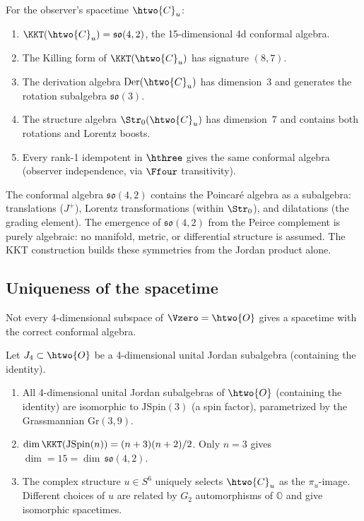 \begin{proposition}
\label{prop:kkt}
For the observer's spacetime $\htwo{C}_u$:
\begin{enumerate}[label=(\alph*)]
\item $\KKT(\htwo{C}_u) = \mathfrak{so}(4,2)$, the 15-dimensional
  4d conformal algebra.

\item The Killing form of $\KKT(\htwo{C}_u)$ has signature $(8, 7)$.

\item The derivation algebra $\mathrm{Der}(\htwo{C}_u)$ has dimension~3
  and generates the rotation subalgebra $\mathfrak{so}(3)$.

\item The structure algebra $\Str_0(\htwo{C}_u)$ has dimension~7 and
  contains both rotations and Lorentz boosts.

\item Every rank-1 idempotent in $\hthree$ gives the same conformal
  algebra (observer independence, via $\Ffour$ transitivity).
\end{enumerate}
\end{proposition}

The conformal algebra $\mathfrak{so}(4,2)$ contains the Poincar\'e
algebra as a subalgebra: translations ($J^+$), Lorentz transformations
(within $\Str_0$), and dilatations (the grading element). The emergence
of $\mathfrak{so}(4,2)$ from the Peirce complement is purely algebraic:
no manifold, metric, or differential structure is assumed. The KKT
construction builds these symmetries from the Jordan product alone.

\subsection{Uniqueness of the spacetime}

Not every 4-dimensional subspace of $\Vzero = \htwo{O}$ gives a
spacetime with the correct conformal algebra.

\begin{proposition}
\label{prop:uniqueness}
Let $J_4 \subset \htwo{O}$ be a 4-dimensional unital Jordan subalgebra
(containing the identity).
\begin{enumerate}[label=(\alph*)]
\item All 4-dimensional unital Jordan subalgebras of $\htwo{O}$
  (containing the identity) are isomorphic to $\mathrm{JSpin}(3)$
  (a spin factor), parametrized by the Grassmannian $\mathrm{Gr}(3, 9)$.

\item $\dim \KKT(\mathrm{JSpin}(n)) = (n+3)(n+2)/2$.
  Only $n = 3$ gives $\dim = 15 = \dim\,\mathfrak{so}(4,2)$.

\item The complex structure $u \in S^6$ uniquely selects $\htwo{C}_u$
  as the $\pi_u$-image. Different choices of $u$ are related by $G_2$
  automorphisms of $\mathbb{O}$ and give isomorphic spacetimes.
\end{enumerate}
\end{proposition}

